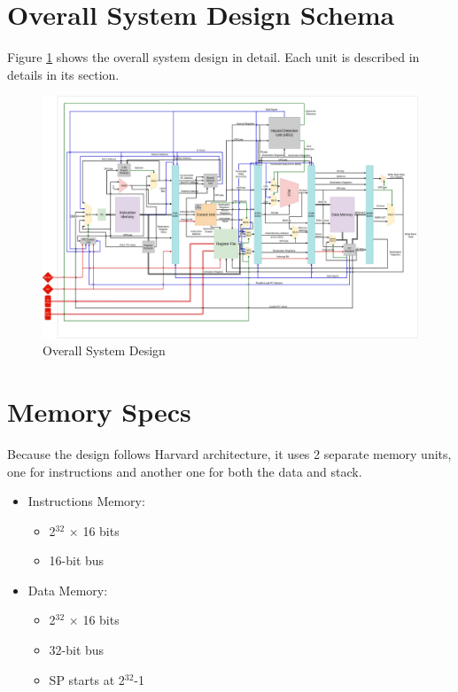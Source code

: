 \section{Overall System Design Schema}
Figure \ref{fig:overall} shows the overall system design in detail. Each unit is described in details in its section.
\begin{center}
    \begin{figure}[hp]
        \centering
        \includegraphics[width=\textwidth]{images/overall_system}
        \caption{Overall System Design}
        \label{fig:overall}
    \end{figure}
\end{center}

\section{Memory Specs}
Because the design follows Harvard architecture, it uses 2 separate memory units, one for instructions and another one for both the data and stack.
\begin{itemize}
    \item Instructions Memory:
    \begin{itemize}
        \item 2$^{32}$ $\times$ 16 bits
        \item 16-bit bus
    \end{itemize}
    \item Data Memory:
    \begin{itemize}
        \item 2$^{32}$ $\times$ 16 bits
        \item 32-bit bus
        \item SP starts at 2$^{32}$-1
    \end{itemize}
\end{itemize}


